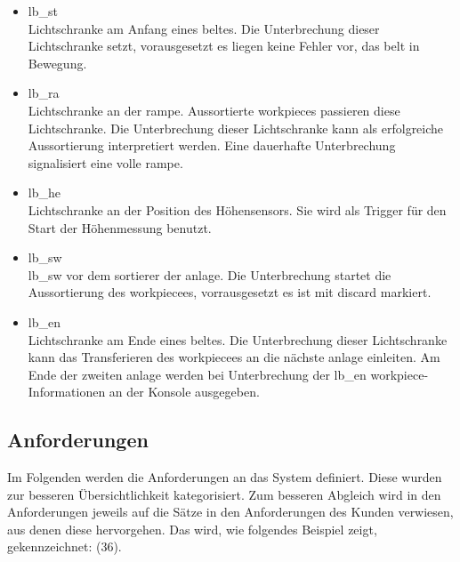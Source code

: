 \begin{itemize}
    \begin{itemize}
        \item \gls{lb_st}\\
        Lichtschranke am Anfang eines \gls{belt}es.
        Die Unterbrechung dieser Lichtschranke setzt, vorausgesetzt es liegen keine
        Fehler vor, das \gls{belt} in Bewegung.
        \item \gls{lb_ra}\\
        Lichtschranke an der \gls{rampe}. Aussortierte \Glspl{workpiece} passieren diese Lichtschranke.
        Die Unterbrechung dieser Lichtschranke kann als erfolgreiche Aussortierung interpretiert werden.
        Eine dauerhafte Unterbrechung signalisiert eine volle \gls{rampe}.
        \item \gls{lb_he}\\
        Lichtschranke an der Position des Höhensensors.
        Sie wird als Trigger für den Start der Höhenmessung benutzt.
        \item \gls{lb_sw}\\
        \gls{lb_sw} vor dem \Gls{sortierer} der \gls{anlage}.
        Die Unterbrechung startet die Aussortierung des \gls{workpiece}es, vorrausgesetzt es ist mit \gls{discard} markiert.
        \item \gls{lb_en}\\
        Lichtschranke am Ende eines \gls{belt}es.
        Die Unterbrechung dieser Lichtschranke kann das Transferieren des \Gls{workpiece}es an die nächste \gls{anlage} einleiten.
        Am Ende der zweiten \gls{anlage} werden bei Unterbrechung der \gls{lb_en} \Gls{workpiece}-Informationen an der Konsole ausgegeben.
    \end{itemize}
\end{itemize}

\subsection{Anforderungen}\label{subsec:anforderungen2}
Im Folgenden werden die Anforderungen an das System definiert. Diese wurden zur besseren
Übersichtlichkeit kategorisiert. Zum besseren Abgleich wird in den
Anforderungen jeweils auf die Sätze in den Anforderungen des Kunden verwiesen, aus denen diese hervorgehen.
Das wird, wie folgendes Beispiel zeigt, gekennzeichnet: (36). 


\FloatBarrier


